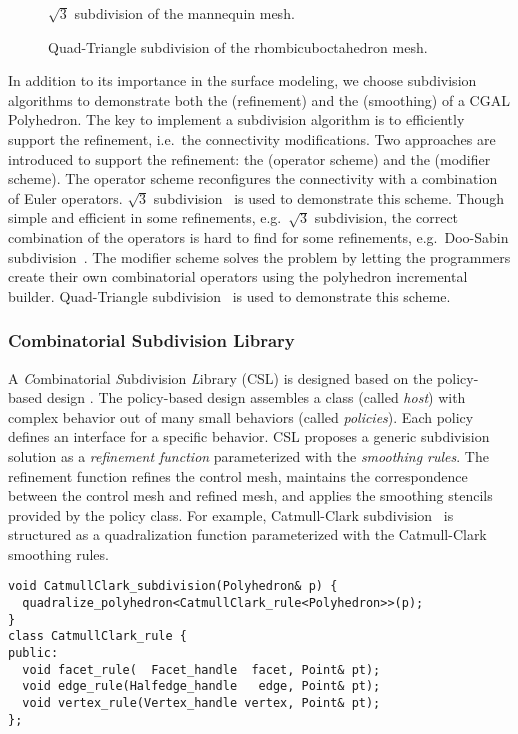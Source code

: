 \documentclass[letter,twocolumn]{article}
\begin{document}
\begin{figure}[htb]
    \caption{$\sqrt{3}$ subdivision of the mannequin mesh.}
    \label{fig:sqrt3}
    \vspace{0.5cm}
    \caption{Quad-Triangle subdivision of the rhombicuboctahedron mesh.}
    \label{fig:quad-triangle}
\end{figure}

In addition to its importance in the surface modeling, we 
choose subdivision algorithms to demonstrate both the 
 (refinement) and the
 (smoothing) of a
CGAL Polyhedron. 
The key to implement a subdivision algorithm is to efficiently support
the refinement, i.e.\ the connectivity modifications. Two approaches
are introduced to support the refinement: the  (operator scheme) and
the  (modifier scheme). 
The operator scheme reconfigures the connectivity with a 
combination of Euler operators. $\sqrt{3}$ subdivision~\cite{sqrt3} is
used to demonstrate this scheme. Though simple and efficient in some
refinements, e.g.\ $\sqrt{3}$ subdivision, the correct combination of
the operators is hard to find for some refinements, e.g.\ Doo-Sabin
subdivision~\cite{ds}. The modifier scheme solves the problem by
letting the programmers create their own combinatorial operators 
using the polyhedron incremental builder. Quad-Triangle
subdivision~\cite{qts,l-pg-03} is used to demonstrate this scheme.


\subsubsection*{Combinatorial Subdivision Library}

A \emph{C}ombinatorial \emph{S}ubdivision \emph{L}ibrary 
(CSL) is designed based on the policy-based design 
\cite{Alexandrescu:2001:MCD}.
The policy-based design assembles a class
(called \emph{host}) with complex behavior out of many 
small behaviors (called \emph{policies}).
Each policy defines an interface for a
specific behavior. CSL proposes a 
generic subdivision solution as a \emph{refinement function}
parameterized with the \emph{smoothing rules}.
The refinement function refines the control mesh,
maintains the correspondence between the control mesh and refined
mesh, and applies the smoothing stencils provided by the policy
class. For example, Catmull-Clark subdivision~\cite{cc} is structured
as a quadralization function parameterized with the Catmull-Clark
smoothing rules.
\begin{lstlisting}
void CatmullClark_subdivision(Polyhedron& p) {    
  quadralize_polyhedron<CatmullClark_rule<Polyhedron>>(p);  
}
class CatmullClark_rule {
public:
  void facet_rule(  Facet_handle  facet, Point& pt);
  void edge_rule(Halfedge_handle   edge, Point& pt);
  void vertex_rule(Vertex_handle vertex, Point& pt);
};
\end{lstlisting}
\end{document}
